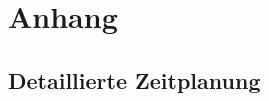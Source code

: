 \section{Anhang}
\subsection{Detaillierte Zeitplanung}
\label{app:Zeitplanung}

\clearpage


\clearpage


\clearpage


\clearpage


\clearpage


\clearpage


\clearpage


\clearpage


\clearpage


\clearpage


\clearpage


\clearpage